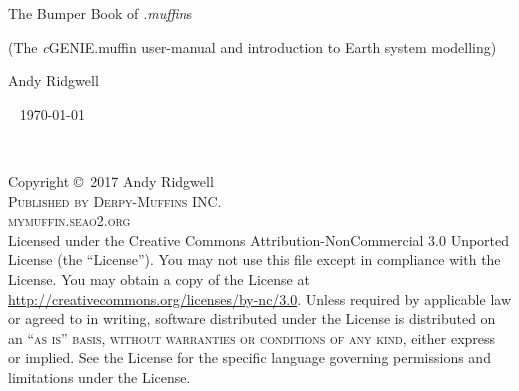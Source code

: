\documentclass[11pt,fleqn]{book} %
\begin{document}

\begingroup
\thispagestyle{empty}
\centering
\vspace*{7.5 cm}
\par\normalfont\fontsize{30}{30}\sffamily\selectfont
\textcolor[rgb]{1,1,0}{The Bumper Book of \textit{.muffin}s}\par %
\vspace*{0.5cm}
\par\normalfont\fontsize{21}{21}\sffamily\selectfont
\textcolor[rgb]{0,0,1}{(The \textit{c}GENIE.muffin user-manual and introduction to Earth system modelling)}\par %
\vspace*{1cm}
{\Huge \textcolor[rgb]{1,1,1}{Andy Ridgwell}}\par %
\endgroup

~\vfill
\textcolor[rgb]{1,0,0}{\today}


\newpage
~\vfill
\thispagestyle{empty}

\noindent Copyright \copyright\ 2017 Andy Ridgwell\\ %

\noindent \textsc{Published by Derpy-Muffins INC.}\\ %

\noindent \textsc{mymuffin.seao2.org}\\ %

\noindent Licensed under the Creative Commons Attribution-NonCommercial 3.0 Unported License (the ``License''). You may not use this file except in compliance with the License. You may obtain a copy of the License at \url{http://creativecommons.org/licenses/by-nc/3.0}. Unless required by applicable law or agreed to in writing, software distributed under the License is distributed on an \textsc{``as is'' basis, without warranties or conditions of any kind}, either express or implied. See the License for the specific language governing permissions and limitations under the License.\\ %
\end{document}

